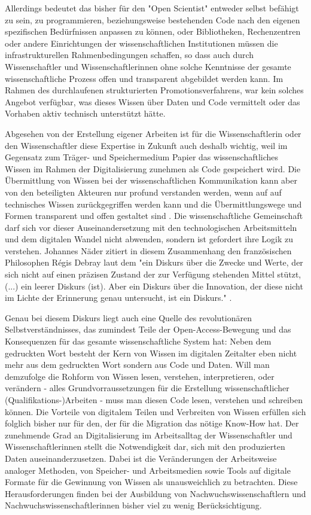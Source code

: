 Allerdings bedeutet das bisher für den "Open Scientist" entweder selbst befähigt zu sein, zu programmieren, beziehungsweise bestehenden Code nach den eigenen spezifischen Bedürfnissen anpassen zu können, oder Bibliotheken, Rechenzentren oder andere Einrichtungen der wissenschaftlichen Institutionen müssen die infrastrukturellen Rahmenbedingungen schaffen, so dass auch durch Wissenschaftler und Wissenschaftlerinnen ohne solche Kenntnisse der gesamte wissenschaftliche Prozess offen und transparent abgebildet werden kann. Im Rahmen des durchlaufenen strukturierten Promotionsverfahrens, war kein solches Angebot verfügbar, was dieses Wissen über Daten und Code vermittelt oder das Vorhaben aktiv technisch unterstützt hätte.

Abgesehen von der Erstellung eigener Arbeiten ist für die Wissenschaftlerin oder den Wissenschaftler diese Expertise in Zukunft auch deshalb wichtig, weil im Gegensatz zum Träger- und Speichermedium Papier das wissenschaftliches Wissen im Rahmen der Digitalisierung zunehmen als Code gespeichert wird. Die Übermittlung von Wissen bei der wissenschaftlichen Kommunikation kann aber von den beteiligten Akteuren nur profund verstanden werden, wenn auf auf technisches Wissen zurückgegriffen werden kann und die Übermittlungswege und Formen transparent und offen gestaltet sind \cite{davis_2011_open}. Die wissenschaftliche Gemeinschaft darf sich vor dieser Auseinandersetzung mit den technologischen Arbeitsmitteln und dem digitalen Wandel nicht abwenden, sondern ist gefordert ihre Logik zu verstehen. Johannes Näder zitiert in diesem Zusammenhang den französischen Philosophen Régis Debray laut dem "ein Diskurs über die Zwecke und Werte, der sich nicht auf einen präzisen Zustand der zur Verfügung stehenden Mittel stützt, (...) ein leerer Diskurs (ist). Aber ein Diskurs über die Innovation, der diese nicht im Lichte der Erinnerung genau untersucht, ist ein Diskurs." \cite[:117]{naeder_2010_open} \cite[:246]{debray2003einfuhrung}.

Genau bei diesem Diskurs liegt auch eine Quelle des revolutionären Selbstverständnisses, das zumindest Teile der Open-Access-Bewegung und das Konsequenzen für das gesamte wissenschaftliche System hat: Neben dem gedruckten Wort besteht der Kern von Wissen im digitalen Zeitalter eben nicht mehr aus dem gedruckten Wort sondern aus Code und Daten. Will man demzufolge die Rohform von Wissen lesen, verstehen, interpretieren, oder verändern - alles Grundvorraussetzungen für die Erstellung wissenschaftlicher (Qualifikations-)Arbeiten - muss man diesen Code lesen, verstehen und schreiben können. Die Vorteile von digitalem Teilen und Verbreiten von Wissen erfüllen sich folglich bisher nur für den, der für die Migration das nötige Know-How hat. Der zunehmende Grad an Digitalisierung im Arbeitsalltag der Wissenschaftler und Wissenschaftlerinnen stellt die Notwendigkeit dar, sich mit den produzierten Daten auseinanderzusetzen. Dabei ist die Veränderungen der Arbeitsweise analoger Methoden, von Speicher- und Arbeitsmedien sowie Tools auf digitale Formate für die Gewinnung von Wissen als unausweichlich zu betrachten. Diese Herausforderungen finden bei der Ausbildung von Nachwuchswissenschaftlern und Nachwuchswissenschaftlerinnen bisher viel zu wenig Berücksichtigung.

